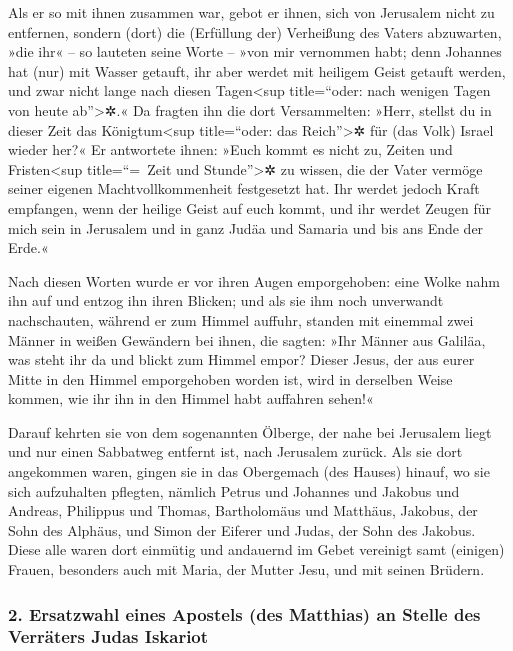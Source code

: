  Als er so mit ihnen zusammen war, gebot er ihnen, sich
von Jerusalem nicht zu entfernen, sondern (dort) die (Erfüllung der)
Verheißung des Vaters abzuwarten, »die ihr« -- so lauteten seine Worte
-- »von mir vernommen habt;  denn Johannes hat (nur) mit
Wasser getauft, ihr aber werdet mit heiligem Geist getauft werden, und
zwar nicht lange nach diesen Tagen\textless sup title=``oder: nach
wenigen Tagen von heute ab''\textgreater✲.«  Da fragten
ihn die dort Versammelten: »Herr, stellst du in dieser Zeit das
Königtum\textless sup title=``oder: das Reich''\textgreater✲ für (das
Volk) Israel wieder her?«  Er antwortete ihnen: »Euch
kommt es nicht zu, Zeiten und Fristen\textless sup title=``=~Zeit und
Stunde''\textgreater✲ zu wissen, die der Vater vermöge seiner eigenen
Machtvollkommenheit festgesetzt hat.  Ihr werdet jedoch
Kraft empfangen, wenn der heilige Geist auf euch kommt, und ihr werdet
Zeugen für mich sein in Jerusalem und in ganz Judäa und Samaria und bis
ans Ende der Erde.«

 Nach diesen Worten wurde er vor ihren Augen emporgehoben:
eine Wolke nahm ihn auf und entzog ihn ihren Blicken; 
und als sie ihm noch unverwandt nachschauten, während er zum Himmel
auffuhr, standen mit einemmal zwei Männer in weißen Gewändern bei ihnen,
 die sagten: »Ihr Männer aus Galiläa, was steht ihr da
und blickt zum Himmel empor? Dieser Jesus, der aus eurer Mitte in den
Himmel emporgehoben worden ist, wird in derselben Weise kommen, wie ihr
ihn in den Himmel habt auffahren sehen!«

 Darauf kehrten sie von dem sogenannten Ölberge, der nahe
bei Jerusalem liegt und nur einen Sabbatweg entfernt ist, nach Jerusalem
zurück.  Als sie dort angekommen waren, gingen sie in das
Obergemach (des Hauses) hinauf, wo sie sich aufzuhalten pflegten,
nämlich Petrus und Johannes und Jakobus und Andreas, Philippus und
Thomas, Bartholomäus und Matthäus, Jakobus, der Sohn des Alphäus, und
Simon der Eiferer und Judas, der Sohn des Jakobus.  Diese
alle waren dort einmütig und andauernd im Gebet vereinigt samt (einigen)
Frauen, besonders auch mit Maria, der Mutter Jesu, und mit seinen
Brüdern.

\hypertarget{ersatzwahl-eines-apostels-des-matthias-an-stelle-des-verruxe4ters-judas-iskariot}{%
\subsubsection{2. Ersatzwahl eines Apostels (des Matthias) an Stelle des
Verräters Judas
Iskariot}\label{ersatzwahl-eines-apostels-des-matthias-an-stelle-des-verruxe4ters-judas-iskariot}}

